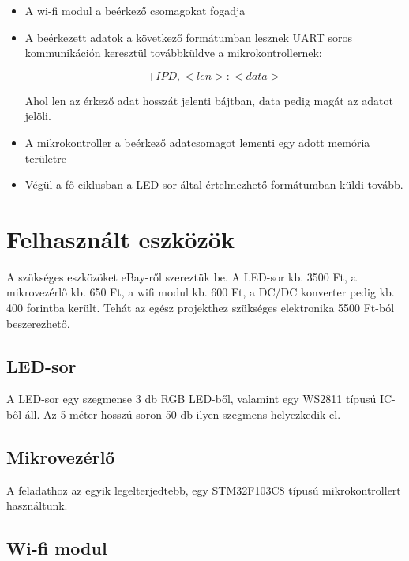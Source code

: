 \documentclass[12pt]{extarticle}
\begin{document}
\begin{itemize}
		\item A wi-fi modul a beérkező csomagokat fogadja
		
		\item A beérkezett adatok a következő formátumban lesznek UART soros kommunikáción keresztül továbbküldve a mikrokontrollernek:
		
		\begin{equation*}
			+IPD,<len>:<data>
		\end{equation*}
		
		Ahol len az érkező adat hosszát jelenti bájtban, data pedig magát az adatot jelöli.
		
		\item A mikrokontroller a beérkező adatcsomagot lementi egy adott memória területre

		\item Végül a fő ciklusban a LED-sor által értelmezhető formátumban küldi tovább.
		
	\end{itemize}
	
	
		
	
	\section{Felhasznált eszközök}
	
	A szükséges eszközöket eBay-ről szereztük be. A LED-sor kb. 3500 Ft, a mikrovezérlő kb. 650 Ft, a wifi modul kb. 600 Ft, a DC/DC konverter pedig kb. 400 forintba került. Tehát az egész projekthez szükséges elektronika 5500 Ft-ból beszerezhető.
	
	\subsection{LED-sor}
	
	A LED-sor egy szegmense 3 db RGB LED-ből, valamint egy  WS2811 típusú IC-ből áll. Az 5 méter hosszú soron 50 db ilyen szegmens helyezkedik el.  
	
	\subsection{Mikrovezérlő}
	
	A feladathoz az egyik legelterjedtebb, egy STM32F103C8 típusú mikrokontrollert használtunk. 
	
	\subsection{Wi-fi modul}
	
\end{document}
